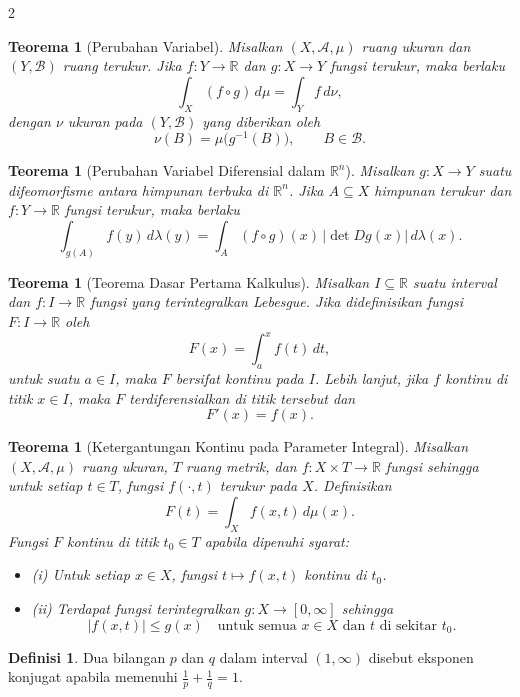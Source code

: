 \documentclass[a4paper,extrafontsizes, 9pt]{memoir}
\theoremstyle{definition}
\newtheorem{definisi}[kalstok]{Definisi}
\theoremstyle{plain}
\newtheorem{teorema}[kalstok]{Teorema}
\theoremstyle{remark}
\begin{document}
\begin{multicols}{2}
  \begin{teorema}[Perubahan Variabel]
    Misalkan $(X,\mathcal{A},\mu)$ ruang ukuran dan $(Y,\mathcal{B})$ ruang terukur.
    Jika $f:Y\to\mathbb{R}$ dan $g:X\to Y$ fungsi terukur, maka berlaku
    \[\int_X (f\circ g)\,d\mu=\int_Y f\,d\nu,\]
    dengan $\nu$ ukuran pada $(Y,\mathcal{B})$ yang diberikan oleh
    \[\nu(B)=\mu\bigl(g^{-1}(B)\bigr),\qquad B\in\mathcal{B}.\]
  \end{teorema}

  \begin{teorema}[Perubahan Variabel Diferensial dalam $\mathbb{R}^{n}$]
    Misalkan $g:X\to Y$ suatu difeomorfisme antara himpunan terbuka di $\mathbb{R}^{n}$.
    Jika $A\subseteq X$ himpunan terukur dan $f:Y\to\mathbb{R}$ fungsi terukur, maka berlaku
    \[\int_{g(A)} f(y)\,d\lambda(y)
      =\int_A (f\circ g)(x)\,|\det Dg(x)|\,d\lambda(x).\]
  \end{teorema}

  \begin{teorema}[Teorema Dasar Pertama Kalkulus]
    Misalkan $I\subseteq\mathbb{R}$ suatu interval dan $f:I\to\mathbb{R}$ fungsi yang terintegralkan Lebesgue.
    Jika didefinisikan fungsi $F:I\to\mathbb{R}$ oleh
    \[F(x)=\int_a^x f(t)\,dt,\]
    untuk suatu $a\in I$, maka $F$ bersifat kontinu pada $I$.
    Lebih lanjut, jika $f$ kontinu di titik $x\in I$, maka $F$ terdiferensialkan di titik tersebut dan
    \[F'(x)=f(x).\]
  \end{teorema}

  \begin{teorema}[Ketergantungan Kontinu pada Parameter Integral]
    Misalkan $(X,\mathcal{A},\mu)$ ruang ukuran, $T$ ruang metrik, dan $f:X\times T\to\mathbb{R}$ fungsi
    sehingga untuk setiap $t\in T$, fungsi $f(\cdot,t)$ terukur pada $X$. Definisikan
    \[F(t)=\int_X f(x,t)\,d\mu(x).\]
    Fungsi $F$ kontinu di titik $t_0\in T$ apabila dipenuhi syarat:
    \begin{itemize}[leftmargin=*, itemsep=0.5mm]
      \item (i) Untuk setiap $x\in X$, fungsi $t\mapsto f(x,t)$ kontinu di $t_0$.
      \item (ii) Terdapat fungsi terintegralkan $g:X\to[0,\infty]$ sehingga
            \[|f(x,t)|\le g(x)\quad\text{untuk semua }x\in X\text{ dan }t\text{ di sekitar }t_0.\]
    \end{itemize}
  \end{teorema}

  \begin{definisi}
    Dua bilangan $p$ dan $q$ dalam interval $(1,\infty)$ disebut eksponen konjugat apabila memenuhi
    $\displaystyle\frac{1}{p}+\frac{1}{q}=1.$
  \end{definisi}


\end{multicols}
\end{document}

